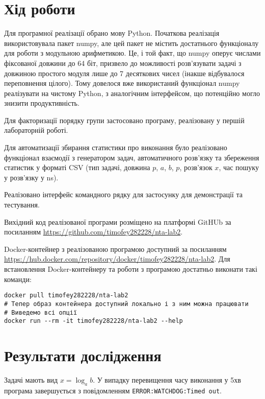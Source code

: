 \section*{Хід роботи}

Для програмної реалізації обрано мову Python. Початкова реалізація використовувала пакет numpy, але цей пакет не містить достатнього функціоналу
для роботи з модульною арифметикою. Це, і той факт, що numpy оперує числами фіксованої довжини до 64 біт, призвело до можливості розв'язувати задачі
з довжиною простого модуля лише до 7 десяткових чисел (інакше відбувалося переповнення цілого). Тому довелося вже використаний функціонал numpy
реалізувати на чистому Python, з аналогічним інтерфейсом, що потенційно могло знизити продуктивність.

Для факторизації порядку групи застосовано програму, реалізовану у першій лабораторній роботі.

Для автоматизації збирання статистики про виконання було реалізовано функціонал взаємодії з генератором задач, автоматичного розв'язку та збереження 
статистик у форматі CSV (тип задачі, довжина $p$, $a$, $b$, $p$, розв'язок $x$, час пошуку у розв'язку у ns).

Реалізовано інтерфейс командного рядку для застосунку для демонстрації та тестування.

Вихідний код реалізованої програми розміщено на платформі GitHUb за посиланням \href{https://github.com/timofey282228/nta-lab2}{https://github.com/timofey282228/nta-lab2}.

Docker-контейнер з реалізованою програмою доступний за посиланням \url{https://hub.docker.com/repository/docker/timofey282228/nta-lab2}. 
Для встановлення Docker-контейнеру та роботи з програмою достатньо виконати такі команди:

\begin{verbatim}
docker pull timofey282228/nta-lab2
# Тепер образ контейнера доступний локально і з ним можна працювати
# Виведемо всі опції
docker run --rm -it timofey282228/nta-lab2 --help
\end{verbatim}

\section*{Результати дослідження}

Задачі мають вид $x = \log_a{b}$. У випадку перевищення часу виконання у 5хв
програма завершується з повідомленням \verb|ERROR:WATCHDOG:Timed out|.

